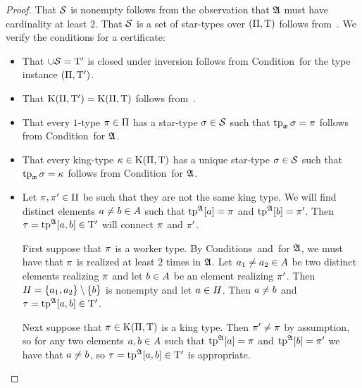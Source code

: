 \begin{proof}
That $\mathcal{S}$ is nonempty follows from the observation that $\mathfrak{A}$ must have
cardinality at least $2$. That $\mathcal{S}$ is a set of star-types over
$(\Pi,\mathrm{T})$ follows from~.
We verify the conditions for a certificate:
\begin{itemize}
  \item[\refcondcerti] 
  That $\cup\mathcal{S} = {\mathrm{T}'}$ is closed under inversion follows from
  Condition~ for the type instance $(\Pi,{\mathrm{T}'})$.
  \item[\refcondcertK]
  That $\mathrm{K}(\Pi,{\mathrm{T}'}) = \mathrm{K}(\Pi,\mathrm{T})$ follows
  from~.
  \item[\refcondcertp]
  That every $1$-type $\pi \in \Pi$ has a star-type $\sigma \in \mathcal{S}$ such
  that $\operatorname{tp}_{\bm{x}}\sigma = \pi$ follows from Condition~ for $\mathfrak{A}$.
  \item[\refcondcertk]
  That every king-type $\kappa \in \mathrm{K}(\Pi,\mathrm{T})$ has a unique star-type
  $\sigma \in \mathcal{S}$ such that $\operatorname{tp}_{\bm{x}}\sigma = \kappa$ follows from
  Condition~ for $\mathfrak{A}$.
  \item[\refcondcertc]
  Let $\pi, {\pi'} \in \Pi$ be such that they are not the same king type.
  We will find distinct elements $a \neq b \in A$ such that
  $\operatorname{tp}^{\mathfrak{A}}[a] = \pi$ and $\operatorname{tp}^{\mathfrak{A}}[b] = {\pi'}$. Then $\tau =
  \operatorname{tp}^{\mathfrak{A}}[a,b] \in {\mathrm{T}'}$ will connect $\pi$ and ${\pi'}$.
  
  First suppose that $\pi$ is a worker type. By
  Conditions~ and~ for $\mathfrak{A}$, we must have that
  $\pi$ is realized at least $2$ times in $\mathfrak{A}$. Let $a_1 \neq a_2 \in
  A$ be two distinct elements realizing $\pi$ and let $b \in A$ be
  an element realizing ${\pi'}$. Then $H = \left\{a_1,a_2\right\} \setminus \left\{b\right\}$ is
  nonempty and let $a \in H$. Then $a \neq b$ and $\tau =
  \operatorname{tp}^{\mathfrak{A}}[a,b] \in {\mathrm{T}'}$.
  
  Next suppose that $\pi \in \mathrm{K}(\Pi,\mathrm{T})$ is a king type. Then ${\pi'}
  \neq \pi$ by assumption, so for any two elements $a, b \in A$ such
  that $\operatorname{tp}^{\mathfrak{A}}[a] = \pi$ and $\operatorname{tp}^{\mathfrak{A}}[b] = {\pi'}$ we have that $a
  \neq b$, so $\tau = \operatorname{tp}^{\mathfrak{A}}[a,b] \in {\mathrm{T}'}$ is appropriate.
\end{itemize}
\end{proof}

